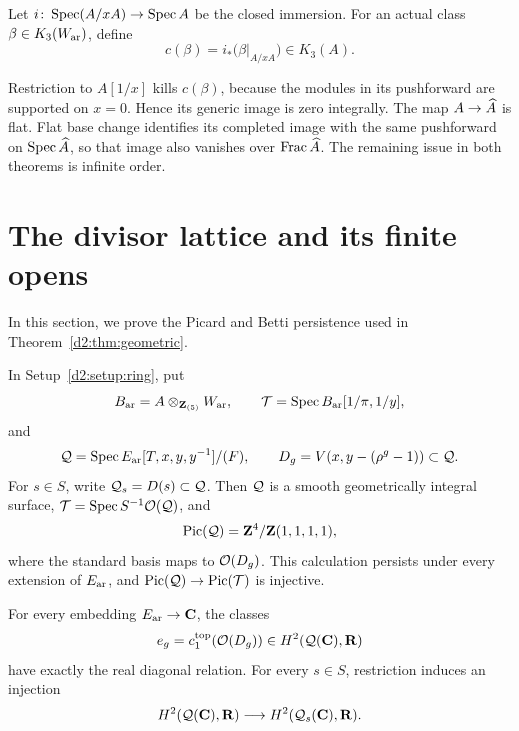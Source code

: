 \begin{definition}\label{d2:defn:supported}
Let \(i\colon\operatorname{Spec}(A/xA)\to\operatorname{Spec} A\) be the closed immersion.
For an actual class \(\beta\in K_3(W_{\mathrm{ar}})\), define
\[
 c(\beta)=i_*\bigl(\beta|_{A/xA}\bigr)\in K_3(A).
\]
\end{definition}

Restriction to \(A[1/x]\) kills \(c(\beta)\), because the modules in its
pushforward are supported on \(x=0\). Hence its generic image is zero
integrally. The map \(A\to\widehat A\) is flat.
Flat base change identifies its completed image with the same
pushforward on \(\operatorname{Spec}\widehat A\), so that image also vanishes over
\(\operatorname{Frac}\widehat A\). The remaining issue in both theorems is infinite order.

\section{The divisor lattice and its finite opens}\label{d2:sec:geometry}

In this section, we prove the Picard and Betti persistence used in
Theorem~\ref{d2:thm:geometric}.

\begin{proposition}\label{d2:prop:geometry}
In Setup~\ref{d2:setup:ring}, put
\[
 B_{\mathrm{ar}}=A\otimes_{\mathbf{Z} _{(5)}}W_{\mathrm{ar}},
 \qquad
 \mathcal T=\operatorname{Spec} B_{\mathrm{ar}}[1/\pi,1/y],
\]
and
\[
 \mathcal Q=\operatorname{Spec} E_{\mathrm{ar}}[T,x,y,y^{-1}]/(F),
 \qquad
 D_g=V(x,y-(\rho^g-1))\subset\mathcal Q.
\]
For \(s\in S\), write \(\mathcal Q_s=D(s)\subset\mathcal Q\).
Then \(\mathcal Q\) is a smooth geometrically integral surface,
\(\mathcal T=\operatorname{Spec} S^{-1}\mathcal O(\mathcal Q)\), and
\[
 \operatorname{Pic}(\mathcal Q)=\mathbf{Z} ^4/\mathbf{Z}(1,1,1,1),
\]
where the standard basis maps to \(\mathcal O(D_g)\).
This calculation persists under every extension of \(E_{\mathrm{ar}}\), and
\(\operatorname{Pic}(\mathcal Q)\to\operatorname{Pic}(\mathcal T)\) is injective.

For every embedding \(E_{\mathrm{ar}}\to\mathbf{C}\), the classes
\[
 e_g=c_1^{\mathrm{top}}(\mathcal O(D_g))
       \in H^2(\mathcal Q(\mathbf{C}),\mathbf{R})
\]
have exactly the real diagonal relation. For every \(s\in S\),
restriction induces an injection
\[
 H^2(\mathcal Q(\mathbf{C}),\mathbf{R})\longrightarrow H^2(\mathcal Q_s(\mathbf{C}),\mathbf{R}).
\]
\end{proposition}

